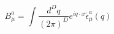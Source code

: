 \begin{equation}
B^a_\mu=\int\frac{d^Dq}{(2\pi)^D}e^{iq\cdot x}\tilde{\epsilon}_\mu^a(q)
\end{equation}

